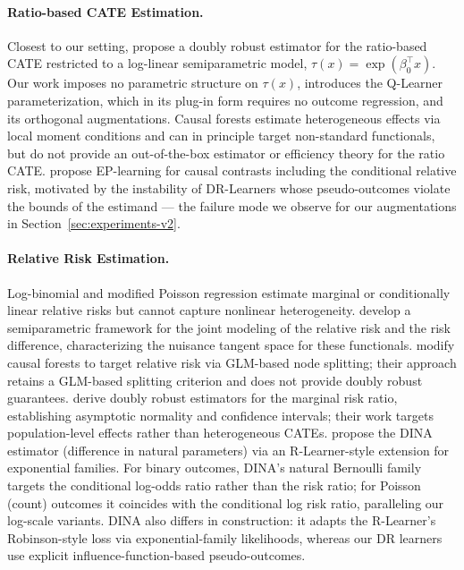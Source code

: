 \documentclass{article}
\begin{document}
\paragraph{Ratio-based CATE Estimation.}
Closest to our setting, \citet{yadlowsky2021ratio} propose a doubly
robust estimator for the ratio-based CATE restricted to a log-linear
semiparametric model, $\tau(x) = \exp(\beta_0^\top x)$. Our work imposes no
parametric structure on $\tau(x)$, introduces the Q-Learner
parameterization, which in its plug-in form requires no outcome
regression, and its orthogonal augmentations. Causal
forests \citep{athey2019grf} estimate heterogeneous effects via local
moment conditions and can in principle target non-standard functionals,
but do not provide an out-of-the-box estimator or efficiency theory for
the ratio CATE. \citet{vanderlaan2024combining} propose EP-learning for
causal contrasts including the conditional relative risk, motivated by
the instability of DR-Learners whose pseudo-outcomes violate the bounds
of the estimand --- the failure mode we observe for our augmentations in
Section~\ref{sec:experiments-v2}.

\paragraph{Relative Risk Estimation.}
Log-binomial and modified Poisson regression
\citep{zou2004modified} estimate marginal or
conditionally linear relative risks but cannot capture nonlinear
heterogeneity. \citet{richardson2017modeling} develop a semiparametric
framework for the joint modeling of the relative risk and the risk
difference, characterizing the nuisance tangent space for these
functionals. \citet{shirvaikar2023} modify causal forests to target
relative risk via GLM-based node splitting; their approach retains a
GLM-based splitting criterion and does not provide doubly robust
guarantees. \citet{boughdiri2025} derive doubly robust estimators for
the marginal risk ratio, establishing asymptotic normality and
confidence intervals; their work targets population-level effects
rather than heterogeneous CATEs. \citet{gao2025dina}
propose the DINA estimator (difference in natural parameters) via an
R-Learner-style extension for exponential families. For binary
outcomes, DINA's natural Bernoulli family targets the conditional
log-odds ratio rather than the risk ratio; for Poisson (count)
outcomes it coincides with the conditional log risk ratio, paralleling
our log-scale variants. DINA also differs in construction: it adapts
the R-Learner's Robinson-style loss via exponential-family
likelihoods, whereas our DR learners use explicit
influence-function-based pseudo-outcomes.
\end{document}
